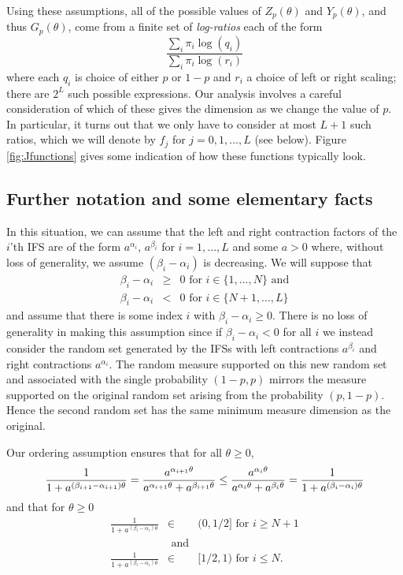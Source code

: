 \documentclass{amsart}
\theoremstyle{plain}
\numberwithin{equation}{section}
\begin{document}
Using these assumptions, all of the possible values of $Z_p(\theta)$ and $Y_p(\theta)$, and thus $G_p(\theta)$, come from a finite
set of \emph{log-ratios} each of the form
\[
    \frac{ \sum_i \pi_i \log( q_i)}{\sum_i \pi_i \log( r_i)}
\]
where each $q_i$ is choice of either $p$ or $1-p$ and $r_i$ a choice of left or right scaling; there are $2^L$ such possible expressions.
Our analysis involves a careful consideration of which of these gives the dimension as we change the value of $p$.
In particular, it turns out that we only have to consider at most $L+1$ such ratios, which we will denote by $f_j$ for $j=0,1,\ldots, L$ (see below).
Figure \ref{fig:Jfunctions} gives some indication of how these functions typically look.

\subsection{Further notation and some elementary facts}

In this situation, we can assume that the left and right contraction factors of the $i$'th IFS are of the form  
$a^{\alpha _{i}}$, $a^{\beta _{i}}$ for $i=1,...,L$ and some $a > 0$ where, without loss of
generality, we assume $(\beta _{i}-\alpha _{i})$ is decreasing. 
 We will suppose that 
\begin{eqnarray*}
   \beta _{i}-\alpha _{i} &\geq &0\text{ for }i\in \{1,...,N\}\text{ and} \\
    \beta _{i}-\alpha _{i} &<&0\text{ for }i\in \{N+1,...,L\}
\end{eqnarray*}%
and assume that there is some index $i$ with $\beta _{i}-\alpha _{i}\geq 0$.
There is no loss of generality in making this assumption since if $\beta_i - \alpha _i<0$ for all $i$ we 
instead consider the random set generated by the IFSs with left contractions $a^{\beta _{i}}$ and right contractions 
$a^{\alpha _{i}}$. 
The random measure supported on this new random set and associated with the single probability 
$(1-p,p)$ mirrors the measure supported on the original random set arising from the probability $(p,1-p)$.
Hence the second random set has the same minimum measure dimension as the
original.

Our ordering assumption ensures that for all $\theta \geq 0$, 
\begin{equation*}
\frac{1}{1+a^{(\beta _{i+1}-\alpha _{i+1})\theta }}=\frac{a^{\alpha
_{i+1}\theta }}{a^{\alpha _{i+1}\theta }+a^{\beta _{i+1}\theta }}\leq \frac{%
a^{\alpha _{i}\theta }}{a^{\alpha _{i}\theta }+a^{\beta _{i}\theta }}=\frac{1%
}{1+a^{(\beta _{i}-\alpha _{i})\theta }}
\end{equation*}%
and that for $\theta \geq 0$ 
\begin{eqnarray*}
\frac{1}{1+a^{(\beta _{i}-\alpha _{i})\theta }} &\in &(0,1/2]\text{ for }%
i\geq N+1\\ &\text{ and}& \\
\frac{1}{1+a^{(\beta _{i}-\alpha _{i})\theta }} &\in &[1/2,1)\text{ for }%
i\leq N.
\end{eqnarray*}
\end{document}
